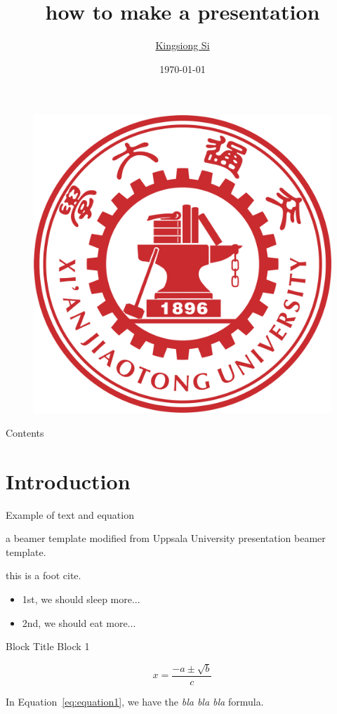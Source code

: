 \documentclass{beamer}
\author[K. Si, \contact]{\href{}{Kingsiong Si}}
\institute[IMKFE, XJTU]{\href{}{Institute of Multimedia Knowledge Fusion and Engineering,\\ Xi'an Jiaotong University}
    \\ \smallskip \contact}
\title[beamer]{how to make a presentation}
\date{\today}
\begin{document}
{

\begin{frame}\label{start}
    \titlepage
    \begin{figure}
            \includegraphics[width=.13\textwidth]{style/xjtu_logo.png} 
    \end{figure}
\end{frame}
}

\begin{frame}{Contents}
    \tableofcontents[sectionstyle=show, subsectionstyle=show/shaded/hide, subsubsectionstyle=show/shaded/hide]
\end{frame}


\section{Introduction}

\begin{frame}{Example of text and equation}

    a beamer template modified from Uppsala University presentation beamer template. 

    this is a foot cite.

    \begin{itemize}[<+->]
        \item 1st, we should sleep more...
        \item 2nd, we should eat more...
    \end{itemize}

    \begin{block}{Block Title}
        Block 1
    \end{block}

    \centering
    \begin{equation}
        x = \frac{{-a \pm \sqrt{{b}}}}{{c}}
        \label{eq:equation1}
    \end{equation}

    In Equation~\ref{eq:equation1}, we have the \textit{bla bla bla} formula.

\end{frame}
\end{document}
